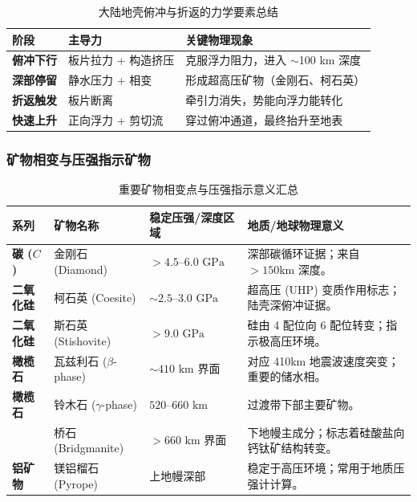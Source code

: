 \documentclass[12pt,a4paper]{article}
\begin{document}
	\begin{table}[htbp]
		\centering
		\caption{大陆地壳俯冲与折返的力学要素总结}
		\label{tab:dynamics}
		\begin{tabularx}{\textwidth}{l l X}
			\toprule
			阶段 & 主导力 & 关键物理现象 \\
			\midrule
			\textbf{俯冲下行} & 板片拉力 + 构造挤压 & 克服浮力阻力，进入 $\sim$100 km 深度 \\
			\textbf{深部停留} & 静水压力 + 相变 & 形成超高压矿物（金刚石、柯石英） \\
			\textbf{折返触发} & 板片断离 & 牵引力消失，势能向浮力能转化 \\
			\textbf{快速上升} & 正向浮力 + 剪切流 & 穿过俯冲通道，最终抬升至地表 \\
			\bottomrule
		\end{tabularx}
	\end{table}
	\subsubsection{矿物相变与压强指示矿物}
	\begin{table}[htbp]
		\centering
		\caption{重要矿物相变点与压强指示意义汇总}
		\label{tab:phase_transitions}
		\small
		\begin{tabularx}{\textwidth}{l l l X}
			\toprule
			系列 & 矿物名称 & 稳定压强/深度区域 & 地质/地球物理意义 \\
			\midrule
			\textbf{碳 ($C$)} & 金刚石 (Diamond) & $> 4.5\text{--}6.0\text{ GPa}$ & 深部碳循环证据；来自 $>150\text{km}$ 深度。 \\
			\addlinespace
			\textbf{二氧化硅} & 柯石英 (Coesite) & $\sim 2.5\text{--}3.0\text{ GPa}$ & 超高压 (UHP) 变质作用标志；陆壳深俯冲证据。 \\
			\textbf{二氧化硅} & 斯石英 (Stishovite) & $> 9.0\text{ GPa}$ & 硅由 4 配位向 6 配位转变；指示极高压环境。 \\
			\addlinespace
			\textbf{橄榄石} & 瓦兹利石 ($\beta$-phase) & $\sim 410\text{ km}$ 界面 & 对应 410km 地震波速度突变；重要的储水相。 \\
			\textbf{橄榄石} & 铃木石 ($\gamma$-phase) & $520\text{--}660\text{ km}$ & 过渡带下部主要矿物。 \\
			& 桥石 (Bridgmanite) & $> 660\text{ km}$ 界面 & 下地幔主成分；标志着硅酸盐向钙钛矿结构转变。 \\
			\addlinespace
			\textbf{铝矿物} & 镁铝榴石 (Pyrope) & 上地幔深部 & 稳定于高压环境；常用于地质压强计计算。 \\
			\bottomrule
		\end{tabularx}
	\end{table}
	
\end{document}
